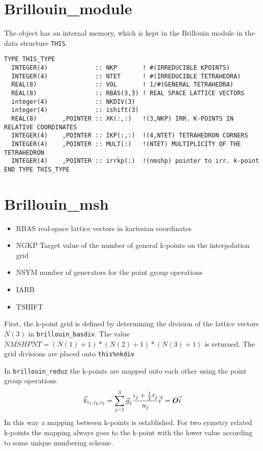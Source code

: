 \documentclass[11pt,a4paper]{report}
\begin{document}
\section{Brillouin\_module}
The object has an internal memory, which is kept in the Brillouin
module in the data structure \verb|THIS|.
\begin{verbatim}
TYPE THIS_TYPE
  INTEGER(4)             :: NKP       ! #(IRREDUCIBLE KPOINTS)
  INTEGER(4)             :: NTET      ! #(IRREDUCIBLE TETRAHEDRA)
  REAL(8)                :: VOL       ! 1/#(GENERAL TETRAHEDRA)
  REAL(8)                :: RBAS(3,3) ! REAL SPACE LATTICE VECTORS
  integer(4)             :: NKDIV(3)
  integer(4)             :: ishift(3)
  REAL(8)       ,POINTER :: XK(:,:)   !(3,NKP) IRR. K-POINTS IN RELATIVE COORDINATES
  INTEGER(4)    ,POINTER :: IKP(:,:)  !(4,NTET) TETRAHEDRON CORNERS
  INTEGER(4)    ,POINTER :: MULT(:)   !(NTET) MULTIPLICITY OF THE TETRAHEDRON
  INTEGER(4)    ,POINTER :: irrkp(:)  !(nmshp) pointer to irr. k-point
END TYPE THIS_TYPE
\end{verbatim}


\section{Brillouin\_msh}
\begin{itemize}
\item RBAS real-space lattice vectors in kartesian coordinates
\item NGKP Target value of the number of general
  k-points on the interpolation grid
\item NSYM number of generators for the point group operations 
\item IARB
\item TSHIFT
\end{itemize}

First, the k-point grid is defined by determining the division of the
lattice vectors $N(3)$ in \verb|brillouin_basdiv|. The value
$NMSHPNT=(N(1)+1)*(N(2)+1)*(N(3)+1)$ is returned. The grid divisions
are placed onto \verb|this%nkdiv|

In \verb|brillouin_reduz| the k-points are mapped onto each other
using the point group operations
\begin{eqnarray}
\vec{k}_{i_1,i_2,i_3}=\sum_{j=1}^3 \vec{g}_{j}\frac{i_{j}+\frac{1}{2}\tau_j}{n_{j}}
\nonumber
\vec{i}'=\bm{O}\vec{i}
\end{eqnarray}
In this way a mapping 
between k-points is established. For two symetry
related k-points the mapping always goes to the k-point with the lower
value according to some unique numbering scheme.
\end{document}
